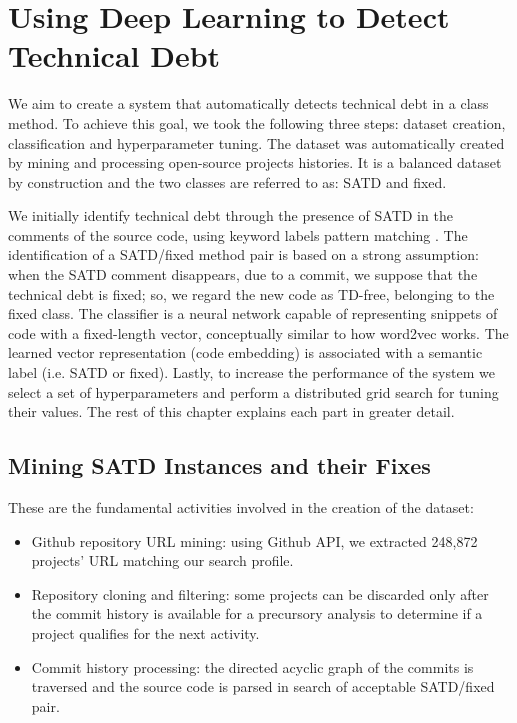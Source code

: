 \chapter{Using Deep Learning to Detect Technical Debt}

We aim to create a system that automatically detects technical debt in a class method. To achieve this goal, we took the following three steps: dataset creation, classification and hyperparameter tuning.
The dataset was automatically created by mining and processing open-source projects histories. It is a balanced dataset by construction and the two classes are referred to as: SATD and fixed.

We initially identify technical debt through the presence of SATD in the comments of the source code, using keyword labels pattern matching \cite{potdar2014exploratory} \cite{rantala2020prevalence}.
The identification of a SATD/fixed method pair is based on a strong assumption: when the SATD comment disappears, due to a commit, we suppose that the technical debt is fixed; so, we regard the new code as TD-free, belonging to the fixed class.
The classifier is a neural network capable of representing snippets of code with a fixed-length vector, conceptually similar to how word2vec works. The learned vector representation (code embedding) is associated with a semantic label (i.e. SATD or fixed).
Lastly, to increase the performance of the system we select a set of hyperparameters and perform a distributed grid search for tuning their values. The rest of this chapter explains each part in greater detail.

\section{Mining SATD Instances and their Fixes}

These are the fundamental activities involved in the creation of the dataset:
\begin{itemize}
    \item Github repository URL mining: using Github API, we extracted 248,872 projects' URL matching our search profile.
    \item Repository cloning and filtering: some projects can be discarded only after the commit history is available for a precursory analysis to determine if a project qualifies for the next activity.
    \item Commit history processing: the directed acyclic graph of the commits is traversed and the source code is parsed in search of acceptable SATD/fixed pair.
\end{itemize}


